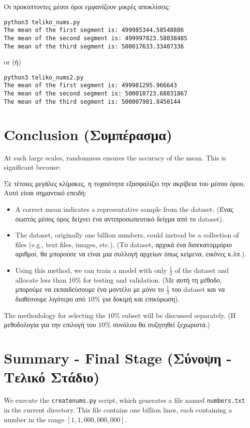\documentclass[a4paper,11pt]{article}
\begin{document}
Οι προκύπτοντες μέσοι όροι εμφανίζουν μικρές αποκλίσεις:

\begin{verbatim}
python3 teliko_nums.py
The mean of the first segment is: 499985344.58548886
The mean of the second segment is: 499997023.58038485
The mean of the third segment is: 500017633.33407336
\end{verbatim}

or (ή)

\begin{verbatim}
python3 teliko_nums2.py
The mean of the first segment is: 499981295.966643
The mean of the second segment is: 500010723.68831867
The mean of the third segment is: 500007981.8450144
\end{verbatim}

\section{Conclusion (Συμπέρασμα)}
At such large scales, randomness ensures the accuracy of the mean. This is significant because:

Σε τέτοιες μεγάλες κλίμακες, η τυχαιότητα εξασφαλίζει την ακρίβεια του μέσου όρου. Αυτό είναι σημαντικό επειδή:

\begin{itemize}
    \item A correct mean indicates a representative sample from the dataset. (Ένας σωστός μέσος όρος δείχνει ένα αντιπροσωπευτικό δείγμα από το dataset).
    \item The dataset, originally one billion numbers, could instead be a collection of files (e.g., text files, images, etc.). (Το dataset, αρχικά ένα δισεκατομμύριο αριθμοί, θα μπορούσε να είναι μια συλλογή αρχείων όπως κείμενα, εικόνες κ.λπ.).
    \item Using this method, we can train a model with only $\frac{1}{3}$ of the dataset and allocate less than $10\%$ for testing and validation. (Με αυτή τη μέθοδο, μπορούμε να εκπαιδεύσουμε ένα μοντέλο με μόνο το $\frac{1}{3}$ του dataset και να διαθέσουμε λιγότερο από $10\%$ για δοκιμή και επικύρωση).
\end{itemize}

The methodology for selecting the $10\%$ subset will be discussed separately. (Η μεθοδολογία για την επιλογή του $10\%$ συνόλου θα συζητηθεί ξεχωριστά.)
{}
\section{Summary - Final Stage (Σύνοψη - Τελικό Στάδιο)}
We execute the \texttt{createnums.py} script, which generates a file named \texttt{numbers.txt} in the current directory. This file contains one billion lines, each containing a number in the range $[1,1,000,000,000]$.
\end{document}
